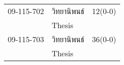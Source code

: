 \begin{longtable}{p{}p{}r{}}
09-115-702 & วิทยานิพนธ์ & 12(0-0)\\
& Thesis & \\[3mm]
09-115-703 & วิทยานิพนธ์ & 36(0-0)\\
& Thesis & \\[3mm]
\end{longtable}
